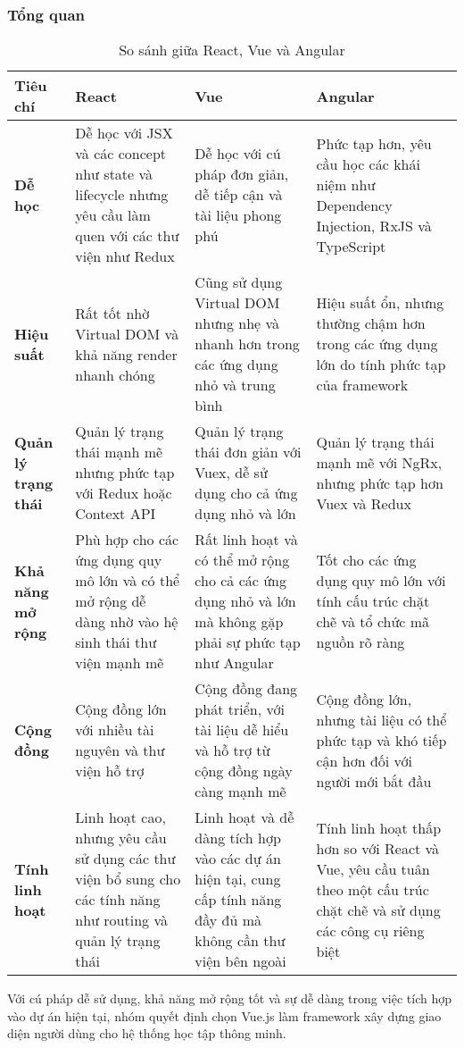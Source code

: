 \subsubsection{Tổng quan}
\begin{table}[H]
    \centering
    \caption{So sánh giữa React, Vue và Angular}
    \begin{tabular}{|p{2.5cm}|p{4.5cm}|p{4.5cm}|p{4.5cm}|}
    \hline
    \textbf{Tiêu chí} & \textbf{React} & \textbf{Vue} & \textbf{Angular} \\
    \hline
    \textbf{Dễ học} & Dễ học với JSX và các concept như state và lifecycle nhưng yêu cầu làm quen với các thư viện như Redux & Dễ học với cú pháp đơn giản, dễ tiếp cận và tài liệu phong phú & Phức tạp hơn, yêu cầu học các khái niệm như Dependency Injection, RxJS và TypeScript \\
    \hline
    \textbf{Hiệu suất} & Rất tốt nhờ Virtual DOM và khả năng render nhanh chóng & Cũng sử dụng Virtual DOM nhưng nhẹ và nhanh hơn trong các ứng dụng nhỏ và trung bình & Hiệu suất ổn, nhưng thường chậm hơn trong các ứng dụng lớn do tính phức tạp của framework \\
    \hline
    \textbf{Quản lý trạng thái} & Quản lý trạng thái mạnh mẽ nhưng phức tạp với Redux hoặc Context API & Quản lý trạng thái đơn giản với Vuex, dễ sử dụng cho cả ứng dụng nhỏ và lớn & Quản lý trạng thái mạnh mẽ với NgRx, nhưng phức tạp hơn Vuex và Redux \\
    \hline
    \textbf{Khả năng mở rộng} & Phù hợp cho các ứng dụng quy mô lớn và có thể mở rộng dễ dàng nhờ vào hệ sinh thái thư viện mạnh mẽ & Rất linh hoạt và có thể mở rộng cho cả các ứng dụng nhỏ và lớn mà không gặp phải sự phức tạp như Angular & Tốt cho các ứng dụng quy mô lớn với tính cấu trúc chặt chẽ và tổ chức mã nguồn rõ ràng \\
    \hline
    \textbf{Cộng đồng} & Cộng đồng lớn với nhiều tài nguyên và thư viện hỗ trợ & Cộng đồng đang phát triển, với tài liệu dễ hiểu và hỗ trợ từ cộng đồng ngày càng mạnh mẽ & Cộng đồng lớn, nhưng tài liệu có thể phức tạp và khó tiếp cận hơn đối với người mới bắt đầu \\
    \hline
    \textbf{Tính linh hoạt} & Linh hoạt cao, nhưng yêu cầu sử dụng các thư viện bổ sung cho các tính năng như routing và quản lý trạng thái & Linh hoạt và dễ dàng tích hợp vào các dự án hiện tại, cung cấp tính năng đầy đủ mà không cần thư viện bên ngoài & Tính linh hoạt thấp hơn so với React và Vue, yêu cầu tuân theo một cấu trúc chặt chẽ và sử dụng các công cụ riêng biệt \\
    \hline
    \end{tabular}

\end{table}
Với cú pháp dễ sử dụng, khả năng mở rộng tốt và sự dễ dàng trong việc tích hợp vào dự án hiện tại, nhóm quyết định chọn Vue.js làm framework xây dựng giao diện người dùng cho hệ thống học tập thông minh.
